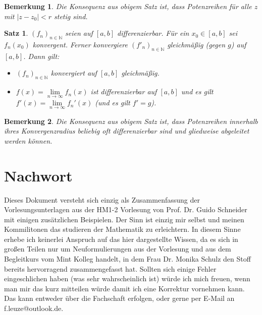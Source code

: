 \documentclass[12pt,a4paper]{article}%
\newtheorem{satz}{Satz}[section]
\newtheorem{bem}{Bemerkung}[section]
\numberwithin{equation}{section}
\newcommand{\N}{\mathbb{N}}
\numberwithin{equation}{subsection}
\begin{document}
\begin{bem}
  Die Konsequenz aus obigem Satz ist, dass Potenzreihen für alle $z$ mit $|z-z_0| < r$ stetig sind.
\end{bem}
\begin{satz}
  $(f_n)_{n \in \N}$ seien auf $[a,b]$ differenzierbar. Für ein $x_0 \in [a,b]$ sei $f_n(x_0)$ konvergent. Ferner konvergiere $(f'_n)_{n \in \N}$ gleichmäßig (gegen $g$) auf $[a,b]$. Dann gilt:
  \begin{itemize}
    \item[1) ] $(f_n)_{n \in \N}$ konvergiert auf $[a,b]$ gleichmäßig.
    \item[2) ] $f(x) = \lim\limits_{n \rightarrow \infty} f_n(x)$ ist differenzierbar auf $[a,b]$ und es gilt $f'(x) = \lim\limits_{n \rightarrow \infty} f_n'(x)$ (und es gilt $f' = g$).
  \end{itemize}
\end{satz}
\begin{bem}
  Die Konsequenz aus obigem Satz ist, dass Potenzreihen innerhalb ihres Konvergenzradius beliebig oft differenzierbar sind und gliedweise abgeleitet werden können.
\end{bem}

\newpage  

\section{Nachwort}
Dieses Dokument versteht sich einzig als Zusammenfassung der Vorlesungsunterlagen aus der HM1-2 Vorlesung von Prof. Dr. Guido Schneider mit einigen zusätzlichen Beispielen. Der Sinn ist einzig mir selbst und meinen Kommilitonen das studieren der Mathematik zu erleichtern. In diesem Sinne erhebe ich keinerlei Anspruch auf das hier dargestellte Wissen, da es sich in großen Teilen nur um Neuformulierungen aus der Vorlesung und aus dem Begleitkurs vom Mint Kolleg handelt, in dem Frau Dr. Monika Schulz den Stoff bereits hervorragend zusammengefasst hat. Sollten sich einige Fehler eingeschlichen haben (was sehr wahrscheinlich ist) würde ich mich freuen, wenn man mir das kurz mitteilen würde damit ich eine Korrektur vornehmen kann. Das kann entweder über die Fachschaft erfolgen, oder gerne per E-Mail an f.leuze@outlook.de.


\end{document}
